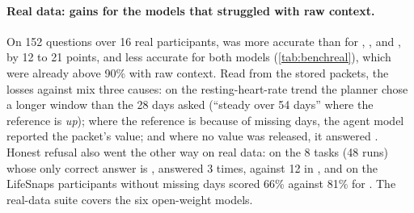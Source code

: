 \paragraph{Real data: gains for the models that struggled with raw context.} On 152 questions over 16 real
participants, \CC{} was more accurate than \CA{} for , ,
 and , by 12 to 21 points, and less accurate for both
 models (\cref{tab:benchreal}), which were already above 90\% with raw context. Read from the stored packets, the  losses against \CA{} mix three causes: on
the resting-heart-rate trend the planner chose a longer window than the 28 days asked (``steady over 54 days'' where the
reference is \emph{up}); where the reference is  because of missing days, the agent model reported the
packet's value; and where no value was released, it answered . Honest refusal also went the other way
on real data: on the 8 tasks (48 runs) whose only correct answer is , \CC{} answered  3 times,
against 12 in \CA{}, and on the LifeSnaps participants without missing days \CC{} scored 66\% against 81\% for \CA{}.
The real-data suite covers the six open-weight models.


